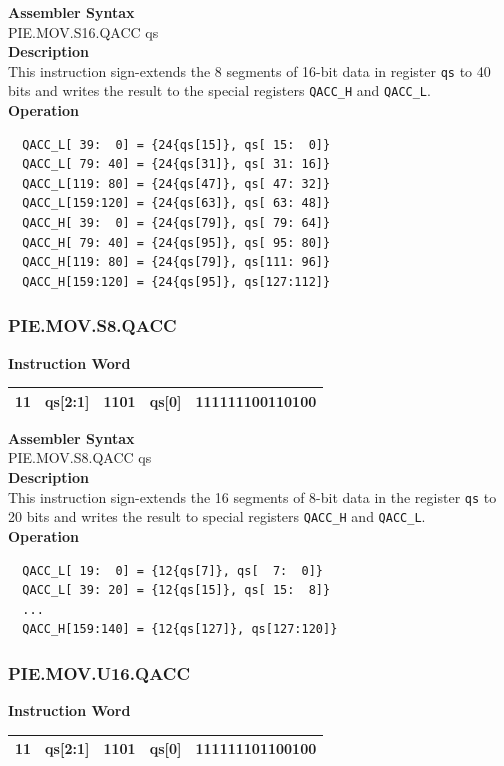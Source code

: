 \textbf{Assembler Syntax} \\
PIE.MOV.S16.QACC qs \\
\textbf{Description} \\
This instruction sign-extends the 8 segments of 16-bit data in register \lstinline{qs} to 40 bits and writes the result to the special registers \lstinline{QACC_H} and \lstinline{QACC_L}.\\
\textbf{Operation}
\begin{lstlisting}
  QACC_L[ 39:  0] = {24{qs[15]}, qs[ 15:  0]}
  QACC_L[ 79: 40] = {24{qs[31]}, qs[ 31: 16]}
  QACC_L[119: 80] = {24{qs[47]}, qs[ 47: 32]}
  QACC_L[159:120] = {24{qs[63]}, qs[ 63: 48]}
  QACC_H[ 39:  0] = {24{qs[79]}, qs[ 79: 64]}
  QACC_H[ 79: 40] = {24{qs[95]}, qs[ 95: 80]}
  QACC_H[119: 80] = {24{qs[79]}, qs[111: 96]}
  QACC_H[159:120] = {24{qs[95]}, qs[127:112]}
\end{lstlisting}

\newpage
\subsubsection{PIE.MOV.S8.QACC}\label{instruction:PIEMOVS8QACC}
\setlength\tabcolsep{6pt}
\textbf{Instruction Word} \\
\begin{tabular}{|c|c|c|c|c|}
	\hline
	11 & qs[2:1] & 1101 & qs[0] & 111111100110100 \\
	\hline
\end{tabular}

\textbf{Assembler Syntax} \\
PIE.MOV.S8.QACC qs \\
\textbf{Description} \\
This instruction sign-extends the 16 segments of 8-bit data in the register \lstinline{qs} to 20 bits and writes the result to special registers \lstinline{QACC_H} and \lstinline{QACC_L}.\\
\textbf{Operation}
\begin{lstlisting}
  QACC_L[ 19:  0] = {12{qs[7]}, qs[  7:  0]}
  QACC_L[ 39: 20] = {12{qs[15]}, qs[ 15:  8]}
  ...
  QACC_H[159:140] = {12{qs[127]}, qs[127:120]}
\end{lstlisting}

\newpage
\subsubsection{PIE.MOV.U16.QACC}\label{instruction:PIEMOVU16QACC}
\setlength\tabcolsep{6pt}
\textbf{Instruction Word} \\
\begin{tabular}{|c|c|c|c|c|}
	\hline
	11 & qs[2:1] & 1101 & qs[0] & 111111101100100 \\
	\hline
\end{tabular}

